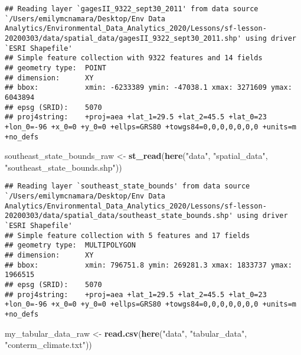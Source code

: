 \documentclass[]{article}
\newenvironment{Shaded}{\begin{snugshade}}{\end{snugshade}}
\newcommand{\KeywordTok}[1]{\textcolor[rgb]{0.13,0.29,0.53}{\textbf{#1}}}
\newcommand{\StringTok}[1]{\textcolor[rgb]{0.31,0.60,0.02}{#1}}
\newcommand{\NormalTok}[1]{#1}
\begin{document}
\begin{verbatim}
## Reading layer `gagesII_9322_sept30_2011' from data source `/Users/emilymcnamara/Desktop/Env Data Analytics/Environmental_Data_Analytics_2020/Lessons/sf-lesson-20200303/data/spatial_data/gagesII_9322_sept30_2011.shp' using driver `ESRI Shapefile'
## Simple feature collection with 9322 features and 14 fields
## geometry type:  POINT
## dimension:      XY
## bbox:           xmin: -6233389 ymin: -47038.1 xmax: 3271609 ymax: 6043894
## epsg (SRID):    5070
## proj4string:    +proj=aea +lat_1=29.5 +lat_2=45.5 +lat_0=23 +lon_0=-96 +x_0=0 +y_0=0 +ellps=GRS80 +towgs84=0,0,0,0,0,0,0 +units=m +no_defs
\end{verbatim}

\begin{Shaded}
\begin{Highlighting}[]
\NormalTok{southeast_state_bounds_raw <-}\StringTok{ }\KeywordTok{st_read}\NormalTok{(}\KeywordTok{here}\NormalTok{(}\StringTok{"data"}\NormalTok{, }\StringTok{"spatial_data"}\NormalTok{, }\StringTok{"southeast_state_bounds.shp"}\NormalTok{))}
\end{Highlighting}
\end{Shaded}

\begin{verbatim}
## Reading layer `southeast_state_bounds' from data source `/Users/emilymcnamara/Desktop/Env Data Analytics/Environmental_Data_Analytics_2020/Lessons/sf-lesson-20200303/data/spatial_data/southeast_state_bounds.shp' using driver `ESRI Shapefile'
## Simple feature collection with 5 features and 17 fields
## geometry type:  MULTIPOLYGON
## dimension:      XY
## bbox:           xmin: 796751.8 ymin: 269281.3 xmax: 1833737 ymax: 1966515
## epsg (SRID):    5070
## proj4string:    +proj=aea +lat_1=29.5 +lat_2=45.5 +lat_0=23 +lon_0=-96 +x_0=0 +y_0=0 +ellps=GRS80 +towgs84=0,0,0,0,0,0,0 +units=m +no_defs
\end{verbatim}

\begin{Shaded}
\begin{Highlighting}[]
\NormalTok{my_tabular_data_raw <-}\StringTok{ }\KeywordTok{read.csv}\NormalTok{(}\KeywordTok{here}\NormalTok{(}\StringTok{"data"}\NormalTok{, }\StringTok{"tabular_data"}\NormalTok{, }\StringTok{"conterm_climate.txt"}\NormalTok{))}
\end{Highlighting}
\end{Shaded}
\end{document}
